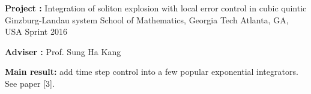 \begin{cventries}
\cventry
{\textbf{Project :} Integration of soliton explosion with local error control in cubic quintic 
  Ginzburg-Landau system} 
{School of Mathematics, Georgia Tech} 
{Atlanta, GA, USA} %
{Sprint 2016} %
{
  \begin{cvitems}
  \item {\textbf{Adviser :} Prof. Sung Ha Kang}
  \item {\textbf{Main result:}  add time step control into a few popular exponential integrators. See paper [3].}
  \end{cvitems}
}







\end{cventries}